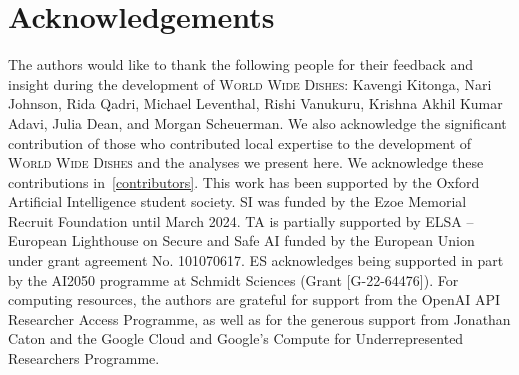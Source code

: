 \section*{Acknowledgements}

The authors would like to thank the following people for their feedback and insight during the development of \textsc{World Wide Dishes}: Kavengi Kitonga, Nari Johnson, Rida Qadri, Michael Leventhal, Rishi Vanukuru, Krishna Akhil Kumar Adavi, Julia Dean, and Morgan Scheuerman. We also acknowledge the significant contribution of those who contributed local expertise to the development of \textsc{World Wide Dishes} and the analyses we present here. We acknowledge these contributions in~\cref{contributors}. This work has been supported by the Oxford Artificial Intelligence student society. SI was funded by the Ezoe Memorial Recruit Foundation until March 2024. TA is partially supported by ELSA – European Lighthouse on Secure and Safe AI funded by the European Union under grant agreement No. 101070617. ES acknowledges being supported in part by the AI2050 programme at Schmidt Sciences (Grant [G-22-64476]). For computing resources, the authors are grateful for support from the OpenAI API Researcher Access Programme, as well as for the generous support from Jonathan Caton and the Google Cloud and Google's Compute for Underrepresented Researchers Programme.

